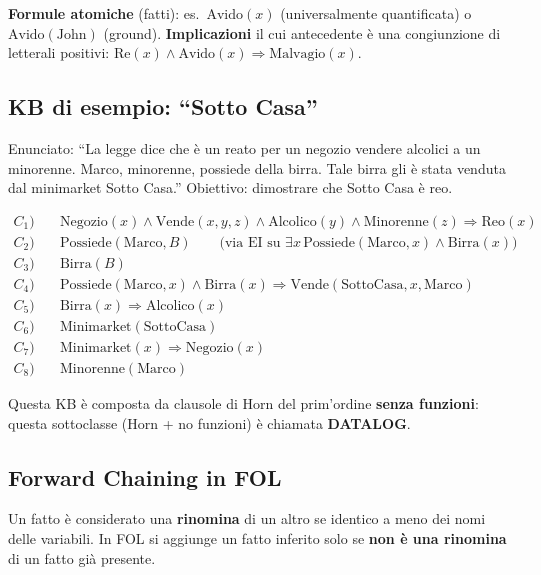 \documentclass[11pt,a4paper]{report}
\begin{document}
\textbf{Formule atomiche} (fatti): es.\ $\text{Avido}(x)$ (universalmente quantificata) o $\text{Avido}(\text{John})$ (ground). \textbf{Implicazioni} il cui antecedente è una congiunzione di letterali positivi: $\text{Re}(x)\wedge\text{Avido}(x)\Rightarrow\text{Malvagio}(x)$.

\subsection*{KB di esempio: ``Sotto Casa''}

Enunciato: ``La legge dice che è un reato per un negozio vendere alcolici a un minorenne. Marco, minorenne, possiede della birra. Tale birra gli è stata venduta dal minimarket Sotto Casa.'' Obiettivo: dimostrare che Sotto Casa è reo.

\begin{align*}
C_1) &\quad \text{Negozio}(x) \wedge \text{Vende}(x,y,z) \wedge \text{Alcolico}(y) \wedge \text{Minorenne}(z) \Rightarrow \text{Reo}(x) \\
C_2) &\quad \text{Possiede}(\text{Marco}, B) \qquad \text{(via EI su } \exists x\, \text{Possiede}(\text{Marco},x)\wedge\text{Birra}(x)\text{)} \\
C_3) &\quad \text{Birra}(B) \\
C_4) &\quad \text{Possiede}(\text{Marco},x) \wedge \text{Birra}(x) \Rightarrow \text{Vende}(\text{SottoCasa},x,\text{Marco}) \\
C_5) &\quad \text{Birra}(x) \Rightarrow \text{Alcolico}(x) \\
C_6) &\quad \text{Minimarket}(\text{SottoCasa}) \\
C_7) &\quad \text{Minimarket}(x) \Rightarrow \text{Negozio}(x) \\
C_8) &\quad \text{Minorenne}(\text{Marco})
\end{align*}

Questa KB è composta da clausole di Horn del prim'ordine \textbf{senza funzioni}: questa sottoclasse (Horn + no funzioni) è chiamata \textbf{DATALOG}.

\subsection*{Forward Chaining in FOL}

Un fatto è considerato una \textbf{rinomina} di un altro se identico a meno dei nomi delle variabili. In FOL si aggiunge un fatto inferito solo se \textbf{non è una rinomina} di un fatto già presente.
\end{document}

